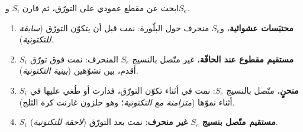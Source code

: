 \begin{method}\label{met:b2:field-lab-methods-2:timing}
ابحث عن مقطع عمودي على التورّق، ثم قارن $S_i$ و$S_e$.
\begin{enumerate}
  \item \textbf{محتبَسات عشوائية}، و$S_e$ منحرف حول البلّورة: نمت قبل أن
        يتكوّن التورّق (\emph{سابقة للتكتونية}).
  \item \textbf{$S_i$ مستقيم مقطوع عند الحافّة}، غير متّصل بالنسيج $S_e$ المنحرف: نمت
        فوق تورّق أقدم، بين تشوّهين (\emph{بينية التكتونية}).
  \item \textbf{$S_i$ منحنٍ}، متّصل بالنسيج $S_e$: نمت في أثناء تكوّن التورّق، فدارت
        أو طُغي عليها في أثناء نموّها (\emph{متزامنة مع التكتونية}؛ وهو حلزون غارنت كرة الثلج).
  \item \textbf{$S_i$ مستقيم متّصل بنسيج $S_e$ غير منحرف}: نمت بعد التورّق
        (\emph{لاحقة للتكتونية}).
\end{enumerate}
\end{method}

